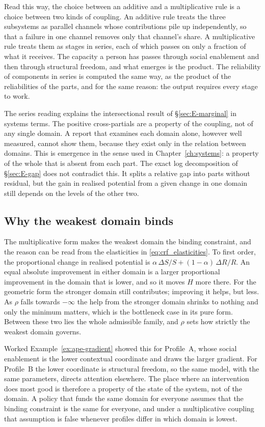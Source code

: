 Read this way, the choice between an additive and a multiplicative rule is a
choice between two kinds of coupling. An additive rule treats the three
subsystems as parallel channels whose contributions pile up independently, so
that a failure in one channel removes only that channel's share. A
multiplicative rule treats them as stages in series, each of which passes on
only a fraction of what it receives. The capacity a person has passes through
social enablement and then through structural freedom, and what emerges is
the product. The reliability of components in series is computed the same way,
as the product of the reliabilities of the parts, and for the same reason: the
output requires every stage to work.

The series reading explains the intersectional result of \S\ref{sec:E-marginal}
in systems terms. The positive cross-partials are a property of the coupling,
not of any single domain. A report that examines each domain alone, however
well measured, cannot show them, because they exist only in the relation
between domains. This is emergence in the sense used in Chapter~\ref{ch:systems}: a
property of the whole that is absent from each part. The exact log
decomposition of \S\ref{sec:E-gap} does not contradict this. It splits a
relative gap into parts without residual, but the gain in realised potential
from a given change in one domain still depends on the levels of the other two.

\subsection{Why the weakest domain binds}
The multiplicative form makes the weakest domain the binding constraint, and
the reason can be read from the elasticities in \eqref{eq:crf_elasticities}.
To first order, the proportional change in realised potential is
$\alpha\,\Delta S/S+(1-\alpha)\,\Delta R/R$. An equal absolute improvement in
either domain is a larger proportional improvement in the domain that is
lower, and so it moves $H$ more there. For the geometric form the stronger
domain still contributes; improving it helps, but less. As $\rho$ falls towards
$-\infty$ the help from the stronger domain shrinks to nothing and only the
minimum matters, which is the bottleneck case in its pure form. Between these
two lies the whole admissible family, and $\rho$ sets how strictly the weakest
domain governs.

Worked Example~\ref{ex:ape-gradient} showed this for Profile~A, whose social
enablement is the lower contextual coordinate and draws the larger gradient.
For Profile~B the lower coordinate is structural freedom, so the same model,
with the same parameters, directs attention elsewhere. The place where an
intervention does most good is therefore a property of the state of the
system, not of the domain. A policy that funds the same domain for everyone
assumes that the binding constraint is the same for everyone, and under a
multiplicative coupling that assumption is false whenever profiles differ in
which domain is lowest.

